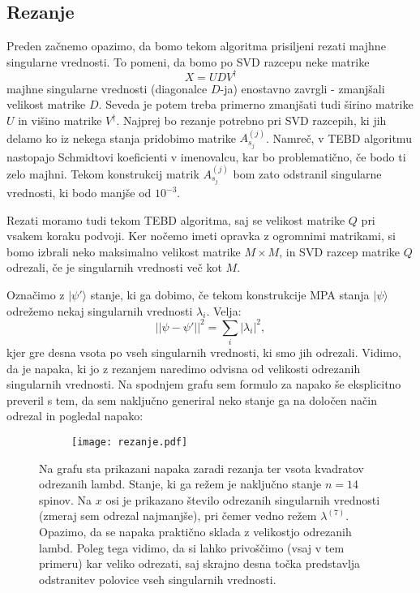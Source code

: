 \documentclass{article}
\begin{document}
\subsection*{Rezanje}
Preden začnemo opazimo, da bomo tekom algoritma prisiljeni rezati majhne singularne vrednosti. To pomeni, da bomo po SVD razcepu neke matrike
\begin{equation*}
X = U D V^\dagger
\end{equation*}
majhne singularne vrednosti (diagonalce $D$-ja) enostavno zavrgli - zmanjšali velikost matrike $D$. Seveda je potem treba primerno zmanjšati tudi širino matrike $U$ in višino matrike $V^\dagger$.
Najprej bo rezanje potrebno pri SVD razcepih, ki jih delamo ko iz nekega stanja pridobimo matrike $A^{(j)}_{s_j}$. Namreč, v TEBD algoritmu nastopajo Schmidtovi koeficienti v imenovalcu, kar bo problematično, če bodo ti zelo majhni. Tekom konstrukcij matrik $A^{(j)}_{s_j}$ bom zato odstranil singularne vrednosti, ki bodo manjše od $10^{-3}$.

Rezati moramo tudi tekom TEBD algoritma, saj se velikost matrike $Q$ pri vsakem koraku podvoji. Ker nočemo imeti opravka z ogromnimi matrikami, si bomo izbrali neko maksimalno velikost matrike $M \times M$, in SVD razcep matrike $Q$ odrezali, če je singularnih vrednosti več kot $M$.

Označimo z $| \psi' \rangle$ stanje, ki ga dobimo, če tekom konstrukcije MPA stanja $| \psi \rangle$ odrežemo nekaj singularnih vrednosti $\lambda_i$. Velja:
\begin{equation*}
|| \psi - \psi'||^2  = \sum_i |\lambda_i|^2,
\end{equation*}
kjer gre desna vsota po vseh singularnih vrednosti, ki smo jih odrezali. Vidimo, da je napaka, ki jo z rezanjem naredimo odvisna od velikosti odrezanih singularnih vrednosti. Na spodnjem grafu sem formulo za napako še eksplicitno preveril s tem, da sem naključno generiral neko stanje ga na določen način odrezal in pogledal napako:

\begin{figure}[H]
\centering
\begin{subfigure}{.7\textwidth}
\texttt{[image: rezanje.pdf]}
\end{subfigure}
\caption*{Na grafu sta prikazani napaka zaradi rezanja ter vsota kvadratov odrezanih lambd. Stanje, ki ga režem je naključno stanje $n=14$ spinov. Na $x$ osi je prikazano število odrezanih singularnih vrednosti (zmeraj sem odrezal najmanjše), pri čemer vedno režem $\lambda^{(7)}$. Opazimo, da se napaka praktično sklada z velikostjo odrezanih lambd. Poleg tega vidimo, da si lahko privoščimo (vsaj v tem primeru) kar veliko odrezati, saj skrajno desna točka predstavlja odstranitev polovice vseh singularnih vrednosti.}
\end{figure}
\end{document}
